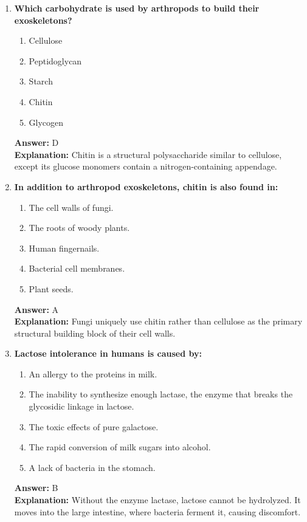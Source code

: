 \documentclass[11pt, a4paper]{article}
\begin{document}
\begin{enumerate}
\item \textbf{Which carbohydrate is used by arthropods to build their exoskeletons?}
\begin{enumerate}[label=\Alph*.]
    \item Cellulose
    \item Peptidoglycan
    \item Starch
    \item Chitin
    \item Glycogen
\end{enumerate}
\textbf{Answer:} D \\
\textbf{Explanation:} Chitin is a structural polysaccharide similar to cellulose, except its glucose monomers contain a nitrogen-containing appendage.

\item \textbf{In addition to arthropod exoskeletons, chitin is also found in:}
\begin{enumerate}[label=\Alph*.]
    \item The cell walls of fungi.
    \item The roots of woody plants.
    \item Human fingernails.
    \item Bacterial cell membranes.
    \item Plant seeds.
\end{enumerate}
\textbf{Answer:} A \\
\textbf{Explanation:} Fungi uniquely use chitin rather than cellulose as the primary structural building block of their cell walls.

\item \textbf{Lactose intolerance in humans is caused by:}
\begin{enumerate}[label=\Alph*.]
    \item An allergy to the proteins in milk.
    \item The inability to synthesize enough lactase, the enzyme that breaks the glycosidic linkage in lactose.
    \item The toxic effects of pure galactose.
    \item The rapid conversion of milk sugars into alcohol.
    \item A lack of bacteria in the stomach.
\end{enumerate}
\textbf{Answer:} B \\
\textbf{Explanation:} Without the enzyme lactase, lactose cannot be hydrolyzed. It moves into the large intestine, where bacteria ferment it, causing discomfort.


\end{enumerate}
\end{document}
